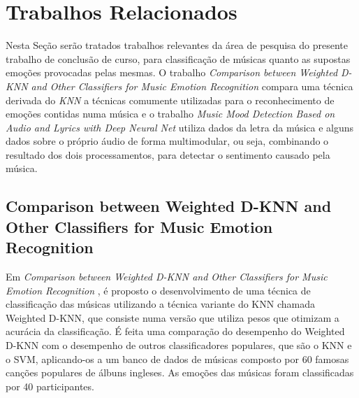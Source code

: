 \documentclass[
	12pt,				%
	openright,			%
	oneside,
	a4paper,			%
	english,			%
	french,				%
	spanish,			%
	brazil				%
	]{abntex2}
\begin{document}
\section{Trabalhos Relacionados}
    Nesta Seção serão tratados trabalhos relevantes da área de pesquisa do presente trabalho de conclusão de curso, para classificação de músicas quanto as supostas emoções provocadas pelas mesmas. O trabalho \textit{Comparison between Weighted D-KNN and Other Classifiers for Music Emotion Recognition} compara uma técnica derivada do \textit{KNN} a técnicas comumente utilizadas para o reconhecimento de emoções contidas numa música e o trabalho \textit{Music Mood Detection Based on Audio and Lyrics with Deep Neural Net} utiliza dados da letra da música e alguns dados sobre o próprio áudio de forma multimodular, ou seja, combinando o resultado dos dois processamentos, para detectar o sentimento causado pela música.
    
    
    
 
    
    \subsection{Comparison between Weighted D-KNN and Other Classifiers for Music Emotion Recognition}
        Em \textit{Comparison between Weighted D-KNN and Other Classifiers for Music Emotion Recognition} \cite{Pao2008}, é proposto o desenvolvimento de uma técnica de classificação das músicas utilizando a técnica variante do KNN chamada Weighted D-KNN, que consiste numa versão que utiliza pesos que otimizam a acurácia da classificação. É feita uma comparação do desempenho do Weighted D-KNN com o desempenho de outros classificadores populares, que são o KNN e o SVM, aplicando-os a um banco de dados de músicas composto por 60 famosas canções populares de álbuns ingleses. As emoções das músicas foram classificadas por 40 participantes. 
\end{document}
